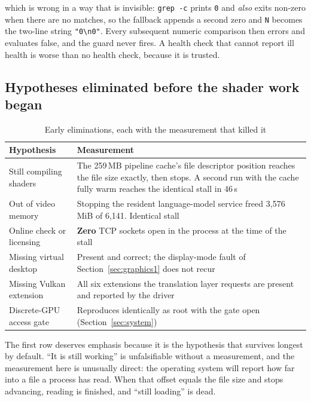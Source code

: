 which is wrong in a way that is invisible: \verb|grep -c| prints \verb|0| and
\emph{also} exits non-zero when there are no matches, so the fallback appends a
second zero and \verb|N| becomes the two-line string \verb|"0\n0"|. Every
subsequent numeric comparison then errors and evaluates false, and the guard
never fires. A health check that cannot report ill health is worse than no health
check, because it is trusted.

\subsection{Hypotheses eliminated before the shader work began}

\begin{table}[htbp]
\caption{Early eliminations, each with the measurement that killed it}
\label{tab:eliminated-early}
\centering
\footnotesize
\begin{tabularx}{\columnwidth}{@{}L{2.5cm}X@{}}
\toprule
\textbf{Hypothesis} & \textbf{Measurement} \\
\midrule
Still compiling shaders &
  The 259\,MB pipeline cache's file descriptor position reaches the file size
  exactly, then stops. A second run with the cache fully warm reaches the
  identical stall in 46\,s \\
Out of video memory &
  Stopping the resident language-model service freed 3{,}576\,MiB of 6{,}141.
  Identical stall \\
Online check or licensing &
  \textbf{Zero} TCP sockets open in the process at the time of the stall \\
Missing virtual desktop &
  Present and correct; the display-mode fault of
  Section~\ref{sec:graphics1} does not recur \\
Missing Vulkan extension &
  All six extensions the translation layer requests are present and reported by
  the driver \\
Discrete-GPU access gate &
  Reproduces identically as root with the gate open
  (Section~\ref{sec:system}) \\
\bottomrule
\end{tabularx}
\end{table}

The first row deserves emphasis because it is the hypothesis that survives
longest by default. ``It is still working'' is unfalsifiable without a
measurement, and the measurement here is unusually direct: the operating system
will report how far into a file a process has read. When that offset equals the
file size and stops advancing, reading is finished, and ``still loading'' is
dead.


